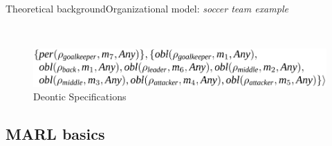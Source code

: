 \begin{frame}{Theoretical background}{Organizational model: \textit{soccer team example}}



    \ \\

    \begin{minipage}{\textwidth}
        \centering
        \begin{figure}[H]
            \centering
            \includegraphics[width=0.4\linewidth]{figures/soccer_ds.png}
            \caption*{Deontic Specifications}
        \end{figure}
    \end{minipage}


\end{frame}


\subsection{MARL basics}

